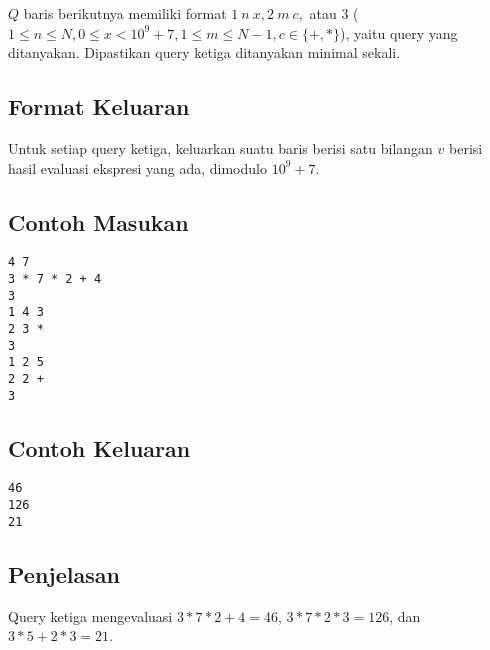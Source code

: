 \documentclass{article}
\begin{document}
$Q$ baris berikutnya memiliki format $1\:n\:x, 2\:m\:c,$ atau $3$ ($1 \leq n \leq N, 0 \leq x < 10^9+7, 1 \leq m \leq N-1, c \in \{+,*\}$), yaitu query yang ditanyakan. Dipastikan query ketiga ditanyakan minimal sekali.

\subsection*{Format Keluaran}

Untuk setiap query ketiga, keluarkan suatu baris berisi satu bilangan $v$ berisi hasil evaluasi ekspresi yang ada, dimodulo $10^9+7$.

\begin{multicols}{2}
\subsection*{Contoh Masukan}
\begin{lstlisting}
4 7
3 * 7 * 2 + 4
3
1 4 3
2 3 *
3
1 2 5
2 2 +
3
\end{lstlisting}
\columnbreak
\subsection*{Contoh Keluaran}
\begin{lstlisting}
46
126
21
\end{lstlisting}
\vfill
\null
\end{multicols}

\subsection*{Penjelasan}
Query ketiga mengevaluasi $3 * 7 * 2 + 4 = 46$, $3 * 7 * 2 * 3 = 126$, dan $3 * 5 + 2 * 3 = 21$.

\pagebreak
\end{document}
